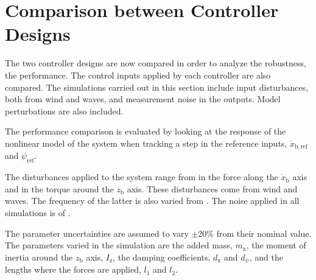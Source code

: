\section{Comparison between Controller Designs}\label{sec:comparison}
The two controller designs are now compared in order to analyze the robustness, the performance. The control inputs applied by each controller are also compared. The simulations carried out in this section include input disturbances, both from wind and waves, and measurement noise in the outputs. Model perturbations are also included.

The performance comparison is evaluated by looking at the response of the nonlinear model of the system when tracking a step in the reference inputs, $\dot{x}_\mathrm{b,ref}$ and $\psi_\mathrm{ref}$. 

The disturbances applied to the system range from  in the force along the $\dot{x}_\mathrm{b}$ axis and  in the torque around the $z_\mathrm{b}$ axis. These disturbances come from wind and waves. The frequency of the latter is also varied from . The noise applied in all simulations is of . 

The parameter uncertainties are assumed to vary $\pm$20\%  from their nominal value. The parameters varied in the simulation are the added mass, $m_\mathrm{x}$, the moment of inertia around the $z_\mathrm{b}$ axis, $I_\mathrm{z}$, the damping coefficients, $d_\mathrm{x}$ and $d_\psi$, and the lengths where the forces are applied, $l_1$ and $l_2$. 

